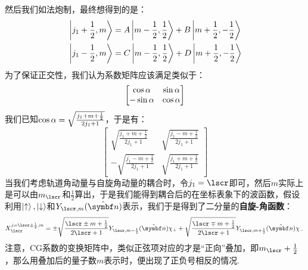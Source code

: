 然后我们如法炮制，最终想得到的是：
\begin{align*}
& \ket{j_{1}+\frac{1}{2},m} = A\ket{m-\frac{1}{2},\frac{1}{2}} + B\ket{m+\frac{1}{2},-\frac{1}{2}} \\
& \ket{j_{1}-\frac{1}{2},m} = C\ket{m-\frac{1}{2},\frac{1}{2}} + D\ket{m+\frac{1}{2},-\frac{1}{2}}
\end{align*}
为了保证正交性，我们认为系数矩阵应该满足类似于：
\[
\begin{bmatrix}
\cos\alpha & \sin\alpha \\
-\sin\alpha& \cos\alpha 
\end{bmatrix}
\]
我们已知\(\cos\alpha=\sqrt{\frac{j_{1}+m+\frac{1}{2}}{2j_{1}+1}}\)，于是有：
\[
\begin{bmatrix}
\sqrt{\frac{j_{1}+m+\frac{1}{2}}{2j_{1}+1}} & \sqrt{\frac{j_{1} - m + \frac{1}{2}}{2j_{1}+1}} \\
-\sqrt{\frac{j_{1} - m + \frac{1}{2}}{2j_{1}+1}} & \sqrt{\frac{j_{1}+m+\frac{1}{2}}{2j_{1}+1}}
\end{bmatrix}
\]
当我们考虑轨道角动量与自旋角动量的耦合时，令\(j_{1}=\lscr\)即可，然后\(m\)实际上是可以由\(m_{\lscr}\)和\(\frac{1}{2}\)算出，于是我们能得到耦合后的在坐标表象下的波函数，假设利用\(\ket{\uparrow},\ket{\downarrow}\)和\(Y_{\lscr,m}(\uv{n})\)表示，我们于是得到了二分量的\textbf{自旋-角函数}：
\[
X_{\lscr}^{j=\lscr\pm\frac{1}{2},m} = \pm\sqrt{\frac{\lscr \pm m + \frac{1}{2}}{2\lscr+1}}Y_{\lscr,m-\frac{1}{2}}(\uv{n})\chi_{+} + \sqrt{\frac{\lscr\mp m + \frac{1}{2}}{2\lscr+1}}Y_{\lscr,m+\frac{1}{2}}(\uv{n})\chi_{-}
\]
注意，CG系数的变换矩阵中，类似正弦项对应的才是“正向”叠加，即\(m_{\lscr}+\frac{1}{2}\)，那么用叠加后的量子数\(m\)表示时，便出现了正负号相反的情况. 
